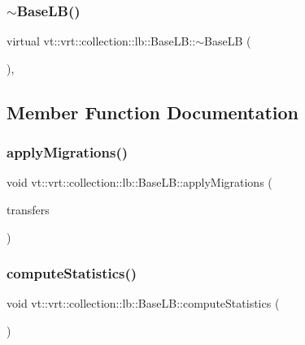 \subsubsection{\texorpdfstring{$\sim$\+Base\+L\+B()}{~BaseLB()}}
{\footnotesize\ttfamily virtual vt\+::vrt\+::collection\+::lb\+::\+Base\+L\+B\+::$\sim$\+Base\+LB (\begin{DoxyParamCaption}{ }\end{DoxyParamCaption})\hspace{0.3cm}{\ttfamily [virtual]}, {\ttfamily [default]}}



\subsection{Member Function Documentation}
\mbox{\label{structvt_1_1vrt_1_1collection_1_1lb_1_1_base_l_b_a7330de226a184378fc6230a56f525ef6}} 
\subsubsection{\texorpdfstring{apply\+Migrations()}{applyMigrations()}}
{\footnotesize\ttfamily void vt\+::vrt\+::collection\+::lb\+::\+Base\+L\+B\+::apply\+Migrations (\begin{DoxyParamCaption}\item[{\hyperlink{structvt_1_1vrt_1_1collection_1_1lb_1_1_base_l_b_a329e8179ec41a1bd4924c79fe23a79af}{Transfer\+Vec\+Type} const \&}]{transfers }\end{DoxyParamCaption})}

\mbox{\label{structvt_1_1vrt_1_1collection_1_1lb_1_1_base_l_b_a44ab2755595d800e50576fa53bee7d91}} 
\subsubsection{\texorpdfstring{compute\+Statistics()}{computeStatistics()}}
{\footnotesize\ttfamily void vt\+::vrt\+::collection\+::lb\+::\+Base\+L\+B\+::compute\+Statistics (\begin{DoxyParamCaption}{ }\end{DoxyParamCaption})}

